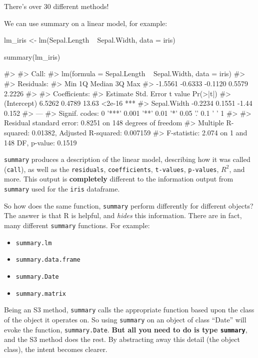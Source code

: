 There's over 30 different methods!

We can use summary on a linear model, for example:

\begin{Schunk}
\begin{Sinput}
lm_iris <- lm(Sepal.Length ~ Sepal.Width, data = iris)

summary(lm_iris)
\end{Sinput}
\begin{Soutput}
#> 
#> Call:
#> lm(formula = Sepal.Length ~ Sepal.Width, data = iris)
#> 
#> Residuals:
#>     Min      1Q  Median      3Q     Max 
#> -1.5561 -0.6333 -0.1120  0.5579  2.2226 
#> 
#> Coefficients:
#>             Estimate Std. Error t value Pr(>|t|)    
#> (Intercept)   6.5262     0.4789   13.63   <2e-16 ***
#> Sepal.Width  -0.2234     0.1551   -1.44    0.152    
#> ---
#> Signif. codes:  0 '***' 0.001 '**' 0.01 '*' 0.05 '.' 0.1 ' ' 1
#> 
#> Residual standard error: 0.8251 on 148 degrees of freedom
#> Multiple R-squared:  0.01382,    Adjusted R-squared:  0.007159 
#> F-statistic: 2.074 on 1 and 148 DF,  p-value: 0.1519
\end{Soutput}
\end{Schunk}

\texttt{summary} produces a description of the linear model, describing
how it was called (\texttt{call}), as well as the \texttt{residuals},
\texttt{coefficients}, \texttt{t-values}, \texttt{p-values}, \(R^2\),
and more. This output is \textbf{completely} different to the
information output from \texttt{summary} used for the \texttt{iris}
dataframe.

So how does the same function, \texttt{summary} perform differently for
different objects? The answer is that R is helpful, and \emph{hides}
this information. There are in fact, many different \texttt{summary}
functions. For example:

\begin{itemize}
\tightlist
\item
  \texttt{summary.lm}
\item
  \texttt{summary.data.frame}
\item
  \texttt{summary.Date}
\item
  \texttt{summary.matrix}
\end{itemize}

Being an S3 method, \texttt{summary} calls the appropriate function
based upon the class of the object it operates on. So using
\texttt{summary} on an object of class ``Date'' will evoke the function,
\texttt{summary.Date}. \textbf{But all you need to do is type
\texttt{summary}}, and the S3 method does the rest. By abstracting away
this detail (the object class), the intent becomes clearer.

